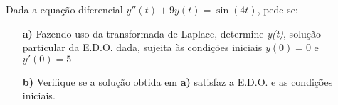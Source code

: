 \linespread{1.5}
Dada a equação diferencial $y''(t) + 9y(t) = \sin{(4t)}$, pede-se:
\begin{itemize}
    \item[\textbf{a)}] Fazendo uso da transformada de Laplace, determine \textit{y(t)}, solução particular da E.D.O. dada, sujeita às condições iniciais $y(0) = 0$ e $y'(0) = 5$
    \item[\textbf{b)}] Verifique se a solução obtida em \textbf{a)} satisfaz a E.D.O. e as condições iniciais.
\end{itemize}